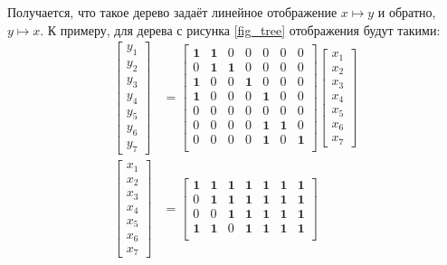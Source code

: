 \documentclass[a4paper, 14pt]{extarticle}
\begin{document}
Получается, что такое дерево задаёт линейное отображение $x \mapsto y$ и
обратно, $y \mapsto x$. К примеру, для дерева с рисунка \ref{fig_tree}
отображения будут такими:
\[
\begin{aligned}
\begin{bmatrix}
y_1 \\ y_2 \\ y_3 \\ y_4 \\ y_5 \\ y_6 \\ y_7
\end{bmatrix} &= \begin{bmatrix}
\mathbf1 & \mathbf1 & 0 & 0 & 0 & 0 & 0 \\
0 & \mathbf1 & \mathbf1 & 0 & 0 & 0 & 0 \\
\mathbf1 & 0 & 0 & \mathbf1 & 0 & 0 & 0 \\
\mathbf1 & 0 & 0 & 0 & \mathbf1 & 0 & 0 \\
0 & 0 & 0 & 0 & 0 & 0 & 0 \\
0 & 0 & 0 & 0 & \mathbf1 & \mathbf1 & 0 \\
0 & 0 & 0 & 0 & \mathbf1 & 0 & \mathbf1 \\
\end{bmatrix} \begin{bmatrix}
x_1 \\ x_2 \\ x_3 \\ x_4 \\ x_5 \\ x_6 \\ x_7
\end{bmatrix}
\\
\begin{bmatrix}
x_1 \\ x_2 \\ x_3 \\ x_4 \\ x_5 \\ x_6 \\ x_7
\end{bmatrix} &= \begin{bmatrix}
\mathbf 1 & \mathbf 1 & \mathbf 1 & \mathbf 1 & \mathbf 1 & \mathbf 1 & \mathbf 1 \\
0 & \mathbf 1 & \mathbf 1 & \mathbf 1 & \mathbf 1 & \mathbf 1 & \mathbf 1 \\
0 & 0 & \mathbf 1 & \mathbf 1 & \mathbf 1 & \mathbf 1 & \mathbf 1 \\
\mathbf 1 & \mathbf 1 & 0 & \mathbf 1 & \mathbf 1 & \mathbf 1 & \mathbf 1 \\

\end{bmatrix}
\end{aligned}\]
\end{document}
